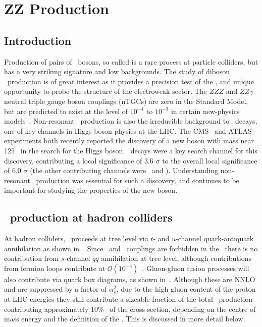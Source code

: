 \graphicspath{{Chapters/TheoryZZProduction/Figures/}}
\chapter{ZZ Production}
\label{chap:TheoryZZProduction}

\section{Introduction}

Production of pairs of \Z\ bosons, so called  is a
rare process at particle colliders, but has a very striking signature
and low backgrounds. The study of diboson \ZZ\ production is of great interest
as it provides a precision test of the \sm, and unique opportunity to
probe the structure of the electroweak sector. 
The $ZZZ$ and $ZZ\gamma$ neutral triple gauge boson
couplings (nTGCs) are zero in the Standard Model, but are predicted to exist at the
level of $10^{-4}$ to $10^{-3}$ in certain new-physics
models~\cite{Ellison:1998}. Non-resonant \ZZ\ production is also the
irreducible background to \HZZ\ decays, one of key channels in Higgs boson physics
at the LHC. The CMS~\cite{CMS_Higgs:2012gu} and ATLAS~\cite{ATLAS_Higgs:2012gk}
experiments both recently reported the discovery of a new boson with mass near
125 \gev\ in the search for the Higgs boson. \HZZ\ decays were a key
search channel for this discovery, contributing a local significance of 3.6
$\sigma$ to the overall local significance of 6.0 $\sigma$ (the other
contributing channels were \Hgg\ and \HWW). Understanding non-resonant \ZZ\
production was essential for such a discovery, and continues to be important for
studying the properties of the new boson.

\section{\ZZ\ production at hadron colliders}

At hadron colliders, \qqZZ\ proceeds at tree level via $t$- and $u$-channel
quark-antiquark annihilation as shown in~\fig{theoryzz-fd-qqZZ}. Since \ZZZ\ and
\ZZg\ couplings are forbidden in the \sm\ there is no contribution from
$s$-channel $q\bar{q}$ annihilation at tree level, although contributions from
fermion loops contribute at $\mathcal{O}(10^{-4})$~\cite{Gounaris:2000dn}.
Gluon-gluon fusion processes will also
contribute via quark box diagrams, as shown in~. Although
these are NNLO and are suppressed by a factor of
$\alpha_s^2$, due to the high gluon content of the proton at LHC energies they
still contribute a sizeable fraction of the total \ZZ\ production \cx\,
contributing approximately 10\%~\cite{Campbell:2011} of the cross-section,
depending on the centre of mass energy and the definition of the \cx.
This is discussed in more detail below.

